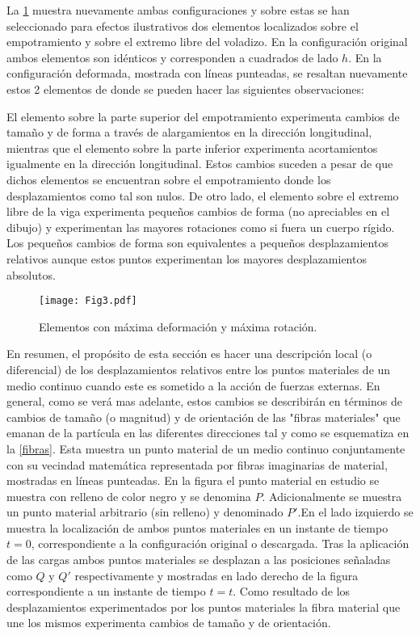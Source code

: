 \documentclass[../notas medios.tex]{subfiles}
\begin{document}
La \cref{viga3} muestra nuevamente ambas configuraciones y sobre estas se han 
seleccionado para efectos ilustrativos dos elementos localizados sobre el 
empotramiento y sobre el extremo libre del voladizo. En la configuración 
original ambos elementos son idénticos y corresponden a cuadrados de lado $h$. 
En la configuración deformada, mostrada con líneas punteadas, se resaltan 
nuevamente estos 2 elementos de donde se pueden hacer las siguientes 
observaciones:

El elemento sobre la parte superior del empotramiento experimenta cambios de tamaño y de forma a través de alargamientos en la dirección longitudinal, mientras que el elemento sobre la parte inferior experimenta acortamientos igualmente en la dirección longitudinal. Estos cambios suceden a pesar de que dichos elementos se encuentran sobre el empotramiento donde los desplazamientos como tal son nulos. De otro lado, el elemento sobre el extremo libre de la viga experimenta pequeños cambios de forma  (no apreciables en el dibujo) y experimentan las mayores rotaciones como si fuera un cuerpo rígido. Los pequeños cambios de forma son equivalentes a pequeños desplazamientos relativos aunque estos puntos experimentan los mayores desplazamientos absolutos.


\begin{figure}[H]
\centering
	\texttt{[image: Fig3.pdf]}
	\caption{Elementos con máxima deformación y máxima rotación.}
	\label{viga3}
\end{figure}

En resumen, el propósito de esta sección es hacer una descripción local (o diferencial) de los desplazamientos relativos entre los puntos materiales de un medio continuo cuando este es sometido a la acción de fuerzas externas. En general, como se verá mas adelante, estos cambios se describirán en términos de cambios de tamaño (o magnitud) y de orientación de las "fibras materiales" que emanan de la partícula en las diferentes direcciones tal y como se esquematiza en la \cref{fibras}. Esta muestra un punto material de un medio continuo conjuntamente con su vecindad matemática representada por fibras imaginarias de material, mostradas en líneas punteadas. En la figura el punto material en estudio se muestra con relleno de color negro y se denomina $P$. Adicionalmente se muestra un punto material arbitrario (sin relleno) y denominado $P'$.En el lado izquierdo se muestra la localización de ambos puntos materiales en un instante de tiempo $t=0$, correspondiente a la configuración original o descargada. Tras la aplicación de las cargas ambos puntos materiales se desplazan a las posiciones señaladas como $Q$ y $Q'$ respectivamente y mostradas en lado derecho de la figura correspondiente a un instante de tiempo $t=t$. Como resultado de los desplazamientos experimentados por los puntos materiales la fibra material que une los mismos experimenta cambios de tamaño y de orientación.
\end{document}
